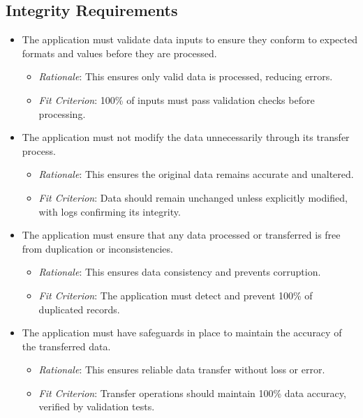 \documentclass[12pt]{article}
\begin{document}
\subsection{Integrity Requirements}
\begin{itemize}
    \item The application must validate data inputs to ensure they conform to
    expected formats and values before they are processed.
    \begin{itemize}
        \item \textit{Rationale}: This ensures only valid data is processed,
        reducing errors.
        \item \textit{Fit Criterion}: 100\% of inputs must pass validation
        checks before processing.
    \end{itemize}
    
    \item The application must not modify the data unnecessarily through its
    transfer process.
    \begin{itemize}
        \item \textit{Rationale}: This ensures the original data remains
        accurate and unaltered.
        \item \textit{Fit Criterion}: Data should remain unchanged unless
        explicitly modified, with logs confirming its integrity.
    \end{itemize}
    
    \item The application must ensure that any data processed or transferred is
    free from duplication or inconsistencies.
    \begin{itemize}
        \item \textit{Rationale}: This ensures data consistency and prevents
        corruption.
        \item \textit{Fit Criterion}: The application must detect and prevent
        100\% of duplicated records.
    \end{itemize}
    
    \item The application must have safeguards in place to maintain the accuracy
    of the transferred data.
    \begin{itemize}
        \item \textit{Rationale}: This ensures reliable data transfer without
        loss or error.
        \item \textit{Fit Criterion}: Transfer operations should maintain 100\%
        data accuracy, verified by validation tests.
    \end{itemize}
\end{itemize}
\end{document}
